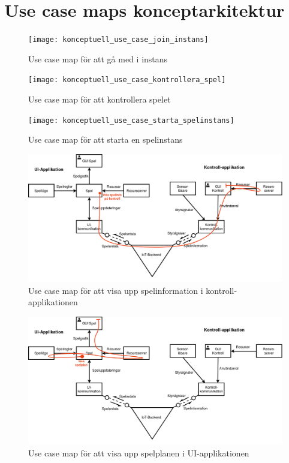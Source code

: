 \section{Use case maps konceptarkitektur}

\begin{figure}[h]
    \centering
    \texttt{[image: konceptuell\_use\_case\_join\_instans]}
    \caption{Use case map för att gå med i instans}
    \label{fig:use_case_koncept_join}
\end{figure}

\begin{figure}[h]
    \centering
    \texttt{[image: konceptuell\_use\_case\_kontrollera\_spel]}
    \caption{Use case map för att kontrollera spelet}
    \label{fig:use_case_koncept_kontrollera}
\end{figure}

\begin{figure}[h]
    \centering
    \texttt{[image: konceptuell\_use\_case\_starta\_spelinstans]}
    \caption{Use case map för att starta en spelinstans}
    \label{fig:use_case_koncept_starta_instans}
\end{figure}

\begin{figure}[h]
    \centering
    \includegraphics[scale=0.4]{images/konceptuell_use_case_visa_spelinfo}
    \caption{Use case map för att visa upp spelinformation i kontroll-applikationen}
    \label{fig:use_case_koncept_visa_spelinfo}
\end{figure}

\begin{figure}[h]
    \centering
    \includegraphics[scale=0.4]{images/konceptuell_use_case_visa_spelplan}
    \caption{Use case map för att visa upp spelplanen i UI-applikationen}
    \label{fig:use_case_koncept_visa_spelplan}
\end{figure}
